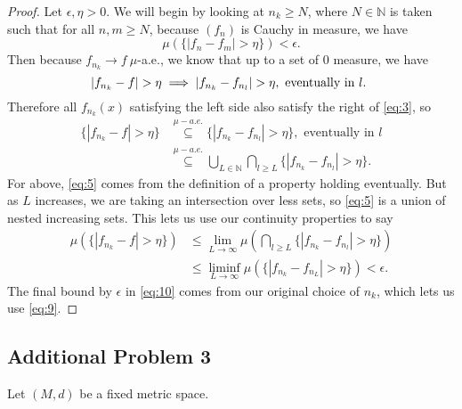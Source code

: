 \documentclass[12pt]{article}
\newcommand{\N}{\mathbb{N}}
\newcommand{\qeq}[1]{\begin{equation}#1\end{equation}}
\newcommand{\qal}[1]{\begin{align}#1\end{align}}
\begin{document}
\begin{itemize}
    \begin{proof}
        Let $\epsilon, \eta > 0$. We will begin by looking at $n_k \geq N$, where $N \in \N$ is taken such that for all $n, m \geq N$, because $(f_n)$ is Cauchy in measure, we have
        \qeq{\mu(\{|f_n - f_m| > \eta\}) < \epsilon. \label{eq:9}} Then because $f_{n_k} \to f ~ \mu$-a.e., we know that up to a set of 0 measure, we have
        \qeq{|f_{n_k} - f| > \eta \implies |f_{n_k} - f_{n_l}| > \eta, \text{ eventually in $l$. \label{eq:3}}}
        Therefore all $f_{n_k}(x)$ satisfying the left side also satisfy the right of \eqref{eq:3}, so
        \qal{\{|f_{n_k} - f| > \eta\} &\overset{\mu-a.e.}{\subseteq} \{|f_{n_k} - f_{n_l}| > \eta\}, \text{ eventually in $l$} \nonumber \\
        &\overset{\mu-a.e.}{\subseteq} \bigcup_{L \in \N} \bigcap_{l \geq L} \{|f_{n_k} - f_{n_l}| > \eta\}. \label{eq:5}}
        For above, \eqref{eq:5} comes from the definition of a property holding eventually. But as $L$ increases, we are taking an intersection over less sets, so \eqref{eq:5} is a union of nested increasing sets. This lets us use our continuity properties to say
        \qal{\mu(\{|f_{n_k} - f| > \eta\}) &\leq \lim_{L \to \infty} \mu \left( \bigcap_{l \geq L} \{|f_{n_k} - f_{n_l}| > \eta\}\right) \nonumber \\
        &\leq \liminf_{L \to \infty} \mu(\{|f_{n_k} - f_{n_L}| > \eta\}) < \epsilon. \label{eq:10}}
        The final bound by $\epsilon$ in \eqref{eq:10} comes from our original choice of $n_k$, which lets us use \eqref{eq:9}.
    \end{proof}
\end{itemize}

\subsection*{Additional Problem 3}

Let $(M, d)$ be a fixed metric space.
\end{document}

